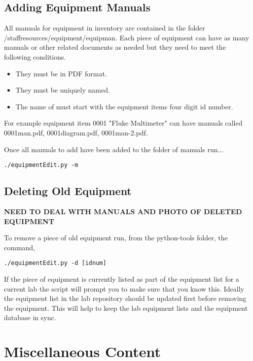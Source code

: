 \documentclass[justified]{LabArx1_5}
\begin{document}
\section{Adding Equipment Manuals}

All manuals for equipment in inventory are contained in the folder /staffresources/equipment/equipman. Each piece of equipment can have as many manuals or other related documents as needed but they need to meet the following conditions.

\begin{itemize}
\item They must be in PDF format.
\item They must be uniquely named.
\item The name of must start with the equipment items four digit id number.

\end{itemize}

For example equipment item 0001 "Fluke Multimeter" can have manuals called 0001man.pdf, 0001diagram.pdf, 0001man-2.pdf. 

Once all manuals to add have been added to the folder of manuals run...

\begin{lstlisting}
./equipmentEdit.py -m
\end{lstlisting}

\section{Deleting Old Equipment}

{\bf NEED TO DEAL WITH MANUALS AND PHOTO OF DELETED EQUIPMENT}

To remove a piece of old equipment run, from the python-tools folder, the command,


\begin{lstlisting}
./equipmentEdit.py -d [idnum]       
\end{lstlisting}

If the piece of equipment is currently listed as part of the equipment list for a current lab the script will prompt you to make sure that you know this. Ideally the equipment list in the lab repository should be updated first before removing the equipment. This will help to keep the lab equipment lists and the equipment database in sync. 

\chapter{Miscellaneous Content}\label{chap:misc}
\end{document}
